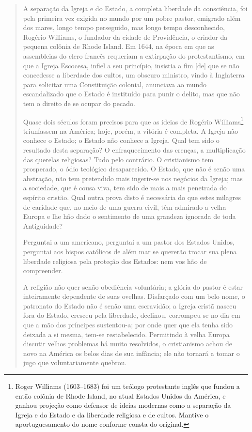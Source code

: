 \begin{quote}
A separação da Igreja e do Estado, a completa liberdade da consciência,
foi pela primeira vez exigida no mundo por um pobre pastor, emigrado
além dos mares, longo tempo perseguido, mas longo tempo desconhecido,
Rogério Williams, o fundador da cidade de Providência, o criador da
pequena colônia de Rhode Island. Em 1644, na época em que as assembleias
do clero francês requeriam a extirpação do protestantismo, em que a
Igreja Escocesa, infiel a seu princípio, insistia a fim {[}de{]} que se
não concedesse a liberdade dos cultos, um obscuro ministro, vindo à
Inglaterra para solicitar uma Constituição colonial, anunciava ao mundo
escandalizado que o Estado é instituído para punir o delito, mas que não
tem o direito de se ocupar do pecado.

Quase dois séculos foram precisos para que as ideias de Rogério
Williams\footnote{Roger Williams (1603--1683) foi um teólogo
  protestante inglês que fundou a então colônia de Rhode Island, no
  atual Estados Unidos da América, e ganhou projeção como defensor de
  ideias modernas como a separação da Igreja e do Estado e da liberdade
  religiosa e de cultos. Mantive o aportuguesamento do nome conforme
  consta do original.} triunfassem na América; hoje, porém, a vitória é
completa. A Igreja não conhece o Estado; o Estado não conhece a Igreja.
Qual tem sido o resultado desta separação? O enfraquecimento das
crenças, a multiplicação das querelas religiosas? Tudo pelo contrário. O
cristianismo tem prosperado, o ódio teológico desaparecido. O Estado,
que não é senão uma abstração, não tem pretendido mais ingerir-se nos
negócios da Igreja; mas a sociedade, que é cousa viva, tem sido de mais
a mais penetrada do espírito cristão. Qual outra prova disto é
necessária do que estes milagres de caridade que, no meio de uma guerra
civil, têm admirado a velha Europa e lhe hão dado o sentimento de uma
grandeza ignorada de toda Antiguidade?

Perguntai a um americano, perguntai a um pastor dos Estados Unidos,
perguntai aos bispos católicos de além mar se quererão trocar sua plena
liberdade religiosa pela proteção dos Estados: nem vos hão de
compreender.

A religião não quer senão obediência voluntária; a glória do pastor é
estar inteiramente dependente de suas ovelhas. Disfarçado com um belo
nome, o patronato do Estado não é senão uma escravidão; a Igreja cristã
nasceu fora do Estado, cresceu pela liberdade, declinou, corrompeu-se no
dia em que a mão dos príncipes sustentou-a; por onde quer que ela tenha
sido deixada a si mesma, tem-se restabelecido. Permitindo à velha Europa
discutir velhos problemas há muito resolvidos, o cristianismo achou de
novo na América os belos dias de sua infância; ele não tornará a tomar
o jugo que voluntariamente quebrou.


\end{quote}

